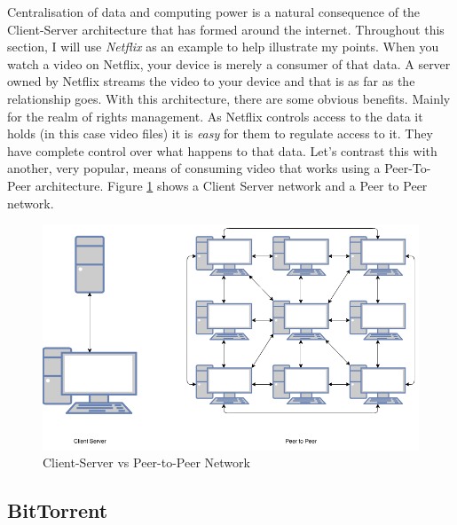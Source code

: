 Centralisation of data and computing power is a natural consequence of the Client-Server architecture that has formed around the internet. Throughout this section, I will use \textit{Netflix}\cite{netflix} as an example to help illustrate my points. When you watch a video on Netflix, your device is merely a consumer of that data. A server owned by Netflix streams the video to your device and that is as far as the relationship goes. With this architecture, there are some obvious benefits. Mainly for the realm of rights management. As Netflix controls access to the data it holds (in this case video files) it is \textit{easy} for them to regulate access to it. They have complete control over what happens to that data. Let's contrast this with another, very popular, means of consuming video that works using a Peer-To-Peer architecture. Figure \ref{fig:client-server-peer2peer} shows a Client Server network and a Peer to Peer network.

\begin{figure}
	\begin{center}
		\includegraphics[width=\textwidth]{diagrams/client-server-vs-p2p}
		\caption{Client-Server vs Peer-to-Peer Network}
		\label{fig:client-server-peer2peer}
	\end{center}
\end{figure}

\subsection{BitTorrent}

